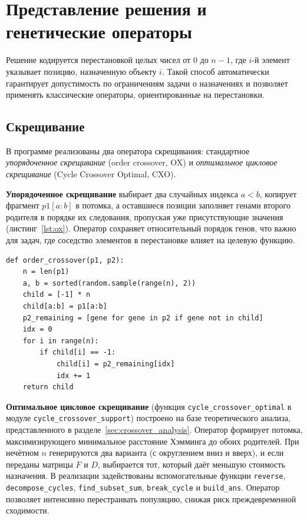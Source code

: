\documentclass[732]{studrep}
\theoremstyle{nonumberplain}
\begin{document}
\section{Представление решения и генетические операторы}
\label{sec:operators}

Решение кодируется перестановкой целых чисел от $0$ до $n-1$, где $i$-й элемент указывает позицию, назначенную объекту $i$. Такой способ автоматически гарантирует допустимость по ограничениям задачи о назначениях и позволяет применять классические операторы, ориентированные на перестановки.

\subsection{Скрещивание}

В программе реализованы два оператора скрещивания: стандартное \textit{упорядоченное скрещивание} (order crossover, OX) и \textit{оптимальное цикловое скрещивание} (Cycle Crossover Optimal, CXO).

\textbf{Упорядоченное скрещивание} выбирает два случайных индекса $a<b$, копирует фрагмент $p1[a:b]$ в потомка, а оставшиеся позиции заполняет генами второго родителя в порядке их следования, пропуская уже присутствующие значения (листинг~\ref{lst:ox}). Оператор сохраняет относительный порядок генов, что важно для задач, где соседство элементов в перестановке влияет на целевую функцию.

\begin{listing}[htbp]
\begin{verbatim}
def order_crossover(p1, p2):
    n = len(p1)
    a, b = sorted(random.sample(range(n), 2))
    child = [-1] * n
    child[a:b] = p1[a:b]
    p2_remaining = [gene for gene in p2 if gene not in child]
    idx = 0
    for i in range(n):
        if child[i] == -1:
            child[i] = p2_remaining[idx]
            idx += 1
    return child
\end{verbatim}
\caption{Оператор упорядоченного скрещивания (order crossover).}
\label{lst:ox}
\end{listing}

\textbf{Оптимальное цикловое скрещивание} (функция
\texttt{cycle\_crossover\_optimal} в модуле
\texttt{cycle\_crossover\_support}) построено на базе теоретического
анализа, представленного в разделе~\ref{sec:crossover_analysis}.
Оператор формирует потомка, максимизирующего минимальное расстояние
Хэмминга до обоих родителей. При нечётном \(n\) генерируются два
варианта (с округлением вниз и вверх), и если переданы матрицы
\(F\) и \(D\), выбирается тот, который даёт меньшую стоимость
назначения. В реализации задействованы вспомогательные функции
\texttt{reverse}, \texttt{decompose\_cycles},
\texttt{find\_subset\_sum}, \texttt{break\_cycle} и
\texttt{build\_ans}. Оператор позволяет интенсивно перестраивать
популяцию, снижая риск преждевременной сходимости.
\end{document}
